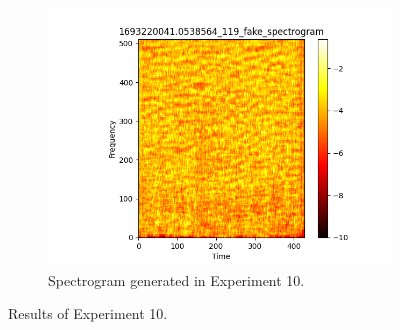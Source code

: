 \begin{figure}[!ht]
\begin{subfigure}{0.3\textwidth}
        \includegraphics[width=\textwidth]{figures/4.5-results/exp10_spectrogram.png}
        \caption{Spectrogram generated in Experiment 10.}
        \label{fig:exp10_spectrogram}
    \end{subfigure}
    \caption{Results of Experiment 10.}
    \label{fig:exp10_results}
\end{figure}